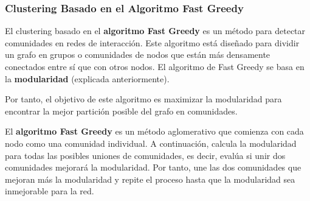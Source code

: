 \subsubsection{Clustering Basado en el Algoritmo Fast Greedy}
El clustering basado en el \textbf{algoritmo Fast Greedy} es un método para detectar comunidades en redes de interacción. Este algoritmo está diseñado para dividir un grafo en grupos o comunidades de nodos que están más densamente conectados entre sí que con otros nodos. El algoritmo de Fast Greedy se basa en la \textbf{modularidad} (explicada anteriormente).

Por tanto, el objetivo de este algoritmo es maximizar la modularidad para encontrar la mejor partición posible del grafo en comunidades.

El \textbf{algoritmo Fast Greedy} es un método aglomerativo que comienza con cada nodo como una comunidad individual. A continuación, calcula la modularidad para todas las posibles uniones de comunidades, es decir, evalúa si unir dos comunidades mejorará la modularidad. Por tanto, une las dos comunidades que mejoran más la modularidad y repite el proceso hasta que la modularidad sea inmejorable para la red.